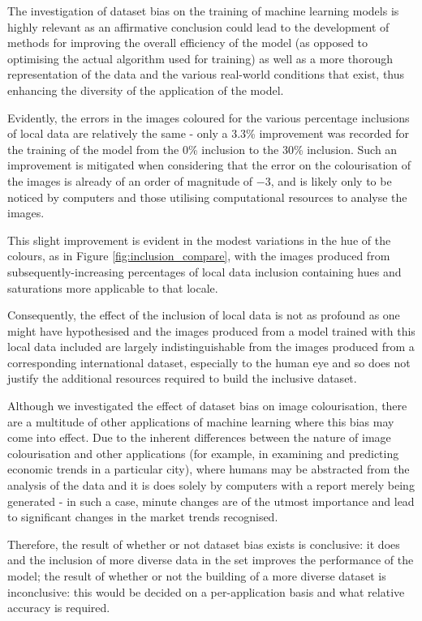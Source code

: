 \documentclass[conference]{IEEEtran}
\begin{document}
The investigation of dataset bias on the training of machine learning models is highly relevant as an affirmative conclusion could lead to the development of methods for improving the overall efficiency of the model (as opposed to optimising the actual algorithm used for training) as well as a more thorough representation of the data and the various real-world conditions that exist, thus enhancing the diversity of the application of the model.

Evidently, the errors in the images coloured for the various percentage inclusions of local data are relatively the same - only a 3.3\% improvement was recorded for the training of the model from the 0\% inclusion to the 30\% inclusion. Such an improvement is mitigated when considering that the error on the colourisation of the images is already of an order of magnitude of $-3$, and is likely only to be noticed by computers and those utilising computational resources to analyse the images.

This slight improvement is evident in the modest variations in the hue of the colours, as in Figure \ref{fig:inclusion_compare}, with the images produced from subsequently-increasing percentages of local data inclusion containing hues and saturations more applicable to that locale.

Consequently, the effect of the inclusion of local data is not as profound as one might have hypothesised and the images produced from a model trained with this local data included are largely indistinguishable from the images produced from a corresponding international dataset, especially to the human eye and so does not justify the additional resources required to build the inclusive dataset.

Although we investigated the effect of dataset bias on image colourisation, there are a multitude of other applications of machine learning where this bias may come into effect. Due to the inherent differences between the nature of image colourisation and other applications (for example, in examining and predicting economic trends in a particular city), where humans may be abstracted from the analysis of the data and it is does solely by computers with a report merely being generated - in such a case, minute changes are of the utmost importance and lead to significant changes in the market trends recognised.

Therefore, the result of whether or not dataset bias exists is conclusive: it does and the inclusion of more diverse data in the set improves the performance of the model; the result of whether or not the building of a more diverse dataset is inconclusive: this would be decided on a per-application basis and what relative accuracy is required.
\end{document}
